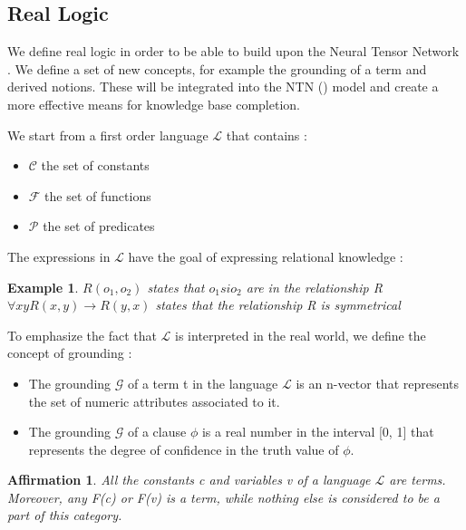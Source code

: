 \documentclass{article}
\newtheorem{prop}{Affirmation}[section]
\newtheorem{example}{Example}[section]
\begin{document}
\subsection{Real Logic}
We define real logic in order to be able to build upon the Neural Tensor Network \cite{NTN}. We define a set of new concepts, for example the grounding of a term and derived notions. These will be integrated into the NTN (\cite{NTN}) model and create a more effective means for knowledge base completion.

We start from a first order language $\mathcal{L}$ that contains \cite{LTN}:\\
\begin{itemize}
	\item $\mathcal{C}$ the set of constants
	\item $\mathcal{F}$ the set of functions
	\item $\mathcal{P}$ the set of predicates
\end{itemize}

The expressions in $\mathcal{L}$ have the goal of expressing relational knowledge \cite{LTN}:\\
\begin{example}
$R(o_1, o_2)$ states that $o_1 si o_2$ are in the relationship R\\
$\forall xyR(x, y) \rightarrow R(y, x)$ states that the relationship R is symmetrical\\
\end{example}

To emphasize the fact that $\mathcal{L}$ is interpreted in the real world, we define the concept of grounding \cite{LTN}:\\
\begin{itemize}
	\item The grounding $\mathcal{G}$ of a term t in the language $\mathcal{L}$ is an n-vector that represents the set of numeric attributes associated to it.\\
	\item The grounding $\mathcal{G}$ of a clause $\phi$ is a real number in the interval [0, 1] that represents the degree of confidence in the truth value of $\phi$.\\
\end{itemize}

\begin{prop}
All the constants c and variables v of a language $\mathcal{L}$ are terms. Moreover, any F(c) or F(v) is a term, while nothing else is considered to be a part of this category. \cite{FOL}
\end{prop}
\end{document}
